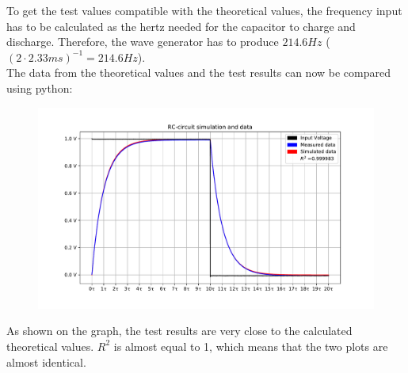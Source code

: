 To get the test values compatible with the theoretical values, the frequency input has to be calculated as the hertz needed for the capacitor to charge and discharge. Therefore, the wave generator has to produce $214.6 Hz$  ($(2 \cdot 2.33 ms)^{-1} = 214.6 Hz$). \\
The data from the theoretical values and the test results can now be compared using python:
\begin{figure}[H]
\center
\includegraphics[scale=0.6]{fig/img/eks_1}
\end{figure}
As shown on the graph, the test results are very close to the calculated theoretical values. $R^2$ is almost equal to 1, which means that the two plots are almost identical.

